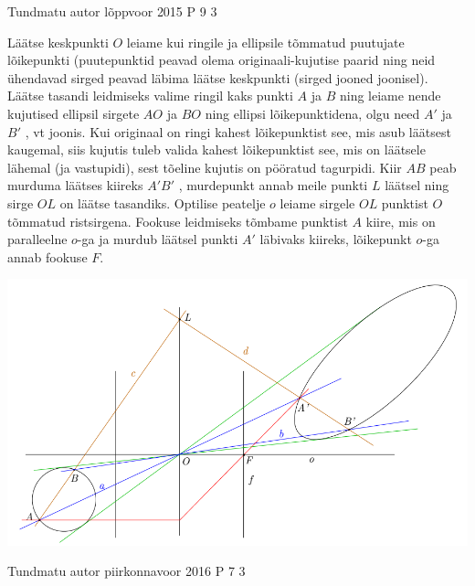 \documentclass[11pt]{article}
\begin{document}
{%
{Tundmatu autor} %
{lõppvoor} %
{2015} %
{P 9} %
{3} %
{

\ifSolution
Läätse keskpunkti $O$ leiame kui ringile ja ellipsile tõmmatud puutujate lõikepunkti (puutepunktid peavad olema originaali-kujutise paarid ning neid ühendavad sirged peavad läbima läätse keskpunkti (sirged jooned joonisel). Läätse tasandi leidmiseks valime ringil kaks punkti $A$ ja $B$ ning leiame nende kujutised ellipsil sirgete $AO$ ja $BO$ ning ellipsi lõikepunktidena, olgu need $A'$ ja $B'$ , vt joonis. Kui originaal on ringi kahest lõikepunktist see, mis asub läätsest kaugemal, siis kujutis tuleb valida kahest lõikepunktist see, mis on läätsele lähemal (ja vastupidi), sest tõeline kujutis on pööratud tagurpidi. Kiir $AB$ peab murduma läätses kiireks $A'B'$ , murdepunkt annab meile punkti $L$ läätsel ning sirge $OL$ on läätse tasandiks. Optilise peatelje $o$ leiame sirgele $OL$ punktist $O$ tõmmatud ristsirgena. Fookuse leidmiseks tõmbame punktist $A$ kiire, mis on paralleelne $o$-ga ja murdub läätsel punkti $A'$ läbivaks kiireks, lõikepunkt $o$-ga annab fookuse $F$.
\begin{center}
	\includegraphics[width=0.5\linewidth]{2015-v3p-09-lah.PNG}
\end{center}
\fi
}


{Tundmatu autor} %
{piirkonnavoor} %
{2016} %
{P 7} %
{3} %
{

}}
\end{document}
